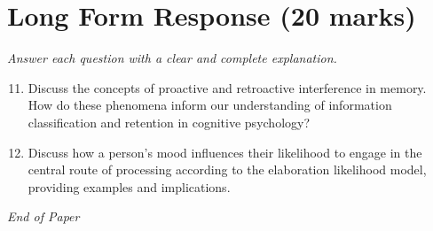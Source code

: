 \documentclass[12pt]{article}
\begin{document}
\section*{Long Form Response (20 marks)}
\textit{Answer each question with a clear and complete explanation.}
\begin{enumerate}[label=\arabic*.]
\setcounter{enumi}{10}
\item Discuss the concepts of proactive and retroactive interference in memory. How do these phenomena inform our understanding of information classification and retention in cognitive psychology?
\item Discuss how a person's mood influences their likelihood to engage in the central route of processing according to the elaboration likelihood model, providing examples and implications.
\end{enumerate}

\vfill
\noindent\textit{End of Paper}
\end{document}

